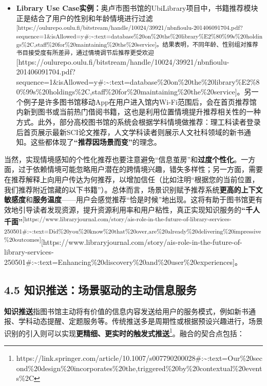 \documentclass[
  letterpaper,
]{scrbook}
\begin{document}
\begin{itemize}
\item
  \textbf{Library Use
  Case实例：}奥卢市图书馆的UbiLibrary项目中，书籍推荐模块正是结合了用户的性别和年龄情境进行过滤\textsuperscript{{[}https://oulurepo.oulu.fi/bitstream/handle/10024/39921/nbnfioulu-201406091704.pdf?sequence=1\&isAllowed=y\#:\textasciitilde:text=database\%20on\%20the\%20library\%E2\%80\%99s\%20holdings\%2C,staff\%20for\%20maintaining\%20the\%20service{]}。结果表明，不同年龄、性别组对推荐书目接受度有所差异，通过情境调节后推荐更受欢迎}{[}https://oulurepo.oulu.fi/bitstream/handle/10024/39921/nbnfioulu-201406091704.pdf?sequence=1\&isAllowed=y\#:\textasciitilde:text=database\%20on\%20the\%20library\%E2\%80\%99s\%20holdings\%2C,staff\%20for\%20maintaining\%20the\%20service{]}。另一个例子是许多图书馆移动App在用户进入馆内Wi-Fi范围后，会在首页推荐馆内新到图书或当前热门借阅书籍，这也是利用位置情境提升推荐相关性的一种方式。此外，部分高校图书馆的系统会根据学科情境做推荐：理工科读者登录后首页展示最新SCI论文推荐，人文学科读者则展示人文社科领域的新书通知。这些都体现了\textbf{``推荐因场景而变''}的理念。
\end{itemize}

当然，实现情境感知的个性化推荐也要注意避免``信息茧房''和\textbf{过度个性化}。一方面，过于依赖情境可能忽略用户潜在的跨情境兴趣，错失多样性；另一方面，需要在推荐解释上向用户传达为何推荐，以增加信任（比如注明``根据您的当前位置，我们推荐附近馆藏的以下书籍''）。总体而言，场景识别赋予推荐系统\textbf{更高的上下文敏感度}和\textbf{服务温度}------用户会感觉推荐``恰是时候''地出现。这将有助于图书馆更有效地引导读者发现资源，提升资源利用率和用户粘性，真正实现知识服务的\textbf{``千人千面''}\textsuperscript{{[}https://www.libraryjournal.com/story/ais-role-in-the-future-of-library-services-250501\#:\textasciitilde:text=Did\%20you\%20know\%20that\%20over,are\%20already\%20delivering\%20impressive\%20outcomes{]}}{[}https://www.libraryjournal.com/story/ais-role-in-the-future-of-library-services-250501\#:\textasciitilde:text=Enhancing\%20discovery\%20and\%20user\%20experiences{]}。

\subsection{4.5
知识推送：场景驱动的主动信息服务}\label{ux77e5ux8bc6ux63a8ux9001ux573aux666fux9a71ux52a8ux7684ux4e3bux52a8ux4fe1ux606fux670dux52a1}

\textbf{知识推送}指图书馆主动将有价值的信息内容发送给用户的服务模式，例如新书通报、学科动态提醒、定题服务等。传统推送多是周期性或根据预设兴趣进行，场景识别的引入则可以实现\textbf{更精细、更实时的触发式推送}\footnote{https://link.springer.com/article/10.1007/s007790200028\#:\textasciitilde:text=Our\%20second\%20design\%20incorporates\%20the,triggered\%20by\%20contextual\%20events\%2C}。融合的契合点包括：
\end{document}
